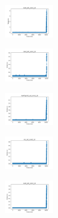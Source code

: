 \begin{figure}[H]
    \hfill
    \begin{subfigure}
        \centering
        \includegraphics[width=0.234\textwidth]{img/HS-LS-v2/ecoli_set_const_10_277451237_time.png}
    \end{subfigure}
    \hfill
    \begin{subfigure}
        \centering
        \includegraphics[width=0.234\textwidth]{img/HS-LS-v2/rand_set_const_10_277451237_time.png}
    \end{subfigure}
    \hfill
    \begin{subfigure}
        \centering
        \includegraphics[width=0.234\textwidth]{img/HS-LS-v2/newthyroid_set_const_10_277451237_time.png}
    \end{subfigure}
    \hfill
    \begin{subfigure}
        \centering
        \includegraphics[width=0.234\textwidth]{img/HS-LS-v2/iris_set_const_10_49258669_time.png}
    \end{subfigure}
    \hfill
    \begin{subfigure}
        \centering
        \includegraphics[width=0.234\textwidth]{img/HS-LS-v2/ecoli_set_const_10_49258669_time.png}
    \end{subfigure}
    \hfill
    \begin{subfigure}

\end{subfigure}
\end{figure}
